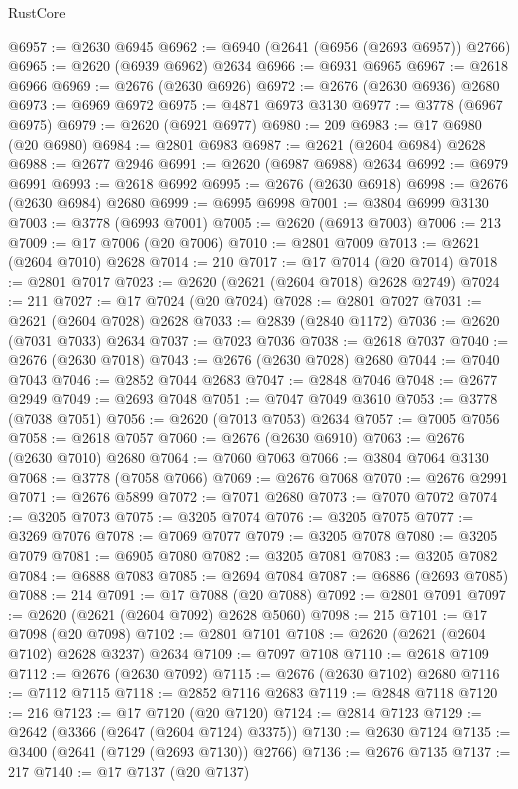 \begin{lexlean}{RustCore}
\begin{coremodule}
@6957 := @2630 @6945
@6962 := @6940 (@2641 (@6956 (@2693 @6957)) @2766)
@6965 := @2620 (@6939 @6962) @2634
@6966 := @6931 @6965
@6967 := @2618 @6966
@6969 := @2676 (@2630 @6926)
@6972 := @2676 (@2630 @6936) @2680
@6973 := @6969 @6972
@6975 := @4871 @6973 @3130
@6977 := @3778 (@6967 @6975)
@6979 := @2620 (@6921 @6977)
@6980 := 209
@6983 := @17 @6980 (@20 @6980)
@6984 := @2801 @6983
@6987 := @2621 (@2604 @6984) @2628
@6988 := @2677 @2946
@6991 := @2620 (@6987 @6988) @2634
@6992 := @6979 @6991
@6993 := @2618 @6992
@6995 := @2676 (@2630 @6918)
@6998 := @2676 (@2630 @6984) @2680
@6999 := @6995 @6998
@7001 := @3804 @6999 @3130
@7003 := @3778 (@6993 @7001)
@7005 := @2620 (@6913 @7003)
@7006 := 213
@7009 := @17 @7006 (@20 @7006)
@7010 := @2801 @7009
@7013 := @2621 (@2604 @7010) @2628
@7014 := 210
@7017 := @17 @7014 (@20 @7014)
@7018 := @2801 @7017
@7023 := @2620 (@2621 (@2604 @7018) @2628 @2749)
@7024 := 211
@7027 := @17 @7024 (@20 @7024)
@7028 := @2801 @7027
@7031 := @2621 (@2604 @7028) @2628
@7033 := @2839 (@2840 @1172)
@7036 := @2620 (@7031 @7033) @2634
@7037 := @7023 @7036
@7038 := @2618 @7037
@7040 := @2676 (@2630 @7018)
@7043 := @2676 (@2630 @7028) @2680
@7044 := @7040 @7043
@7046 := @2852 @7044 @2683
@7047 := @2848 @7046
@7048 := @2677 @2949
@7049 := @2693 @7048
@7051 := @7047 @7049 @3610
@7053 := @3778 (@7038 @7051)
@7056 := @2620 (@7013 @7053) @2634
@7057 := @7005 @7056
@7058 := @2618 @7057
@7060 := @2676 (@2630 @6910)
@7063 := @2676 (@2630 @7010) @2680
@7064 := @7060 @7063
@7066 := @3804 @7064 @3130
@7068 := @3778 (@7058 @7066)
@7069 := @2676 @7068
@7070 := @2676 @2991
@7071 := @2676 @5899
@7072 := @7071 @2680
@7073 := @7070 @7072
@7074 := @3205 @7073
@7075 := @3205 @7074
@7076 := @3205 @7075
@7077 := @3269 @7076
@7078 := @7069 @7077
@7079 := @3205 @7078
@7080 := @3205 @7079
@7081 := @6905 @7080
@7082 := @3205 @7081
@7083 := @3205 @7082
@7084 := @6888 @7083
@7085 := @2694 @7084
@7087 := @6886 (@2693 @7085)
@7088 := 214
@7091 := @17 @7088 (@20 @7088)
@7092 := @2801 @7091
@7097 := @2620 (@2621 (@2604 @7092) @2628 @5060)
@7098 := 215
@7101 := @17 @7098 (@20 @7098)
@7102 := @2801 @7101
@7108 := @2620 (@2621 (@2604 @7102) @2628 @3237) @2634
@7109 := @7097 @7108
@7110 := @2618 @7109
@7112 := @2676 (@2630 @7092)
@7115 := @2676 (@2630 @7102) @2680
@7116 := @7112 @7115
@7118 := @2852 @7116 @2683
@7119 := @2848 @7118
@7120 := 216
@7123 := @17 @7120 (@20 @7120)
@7124 := @2814 @7123
@7129 := @2642 (@3366 (@2647 (@2604 @7124) @3375))
@7130 := @2630 @7124
@7135 := @3400 (@2641 (@7129 (@2693 @7130)) @2766)
@7136 := @2676 @7135
@7137 := 217
@7140 := @17 @7137 (@20 @7137)

\end{coremodule}
\end{lexlean}
